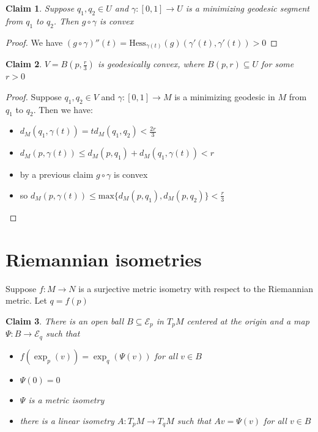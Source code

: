 \documentclass[a4paper,11pt]{article}
\newtheorem{claim}{Claim}
\begin{document}
\begin{claim}
    Suppose $q_1,q_2 \in U$ and $\gamma:[0,1] \to U$ is a minimizing geodesic segment from $q_1$ to $q_2$. 
    Then $g \circ \gamma$ is convex
\end{claim}

\begin{proof}
  We have $(g \circ \gamma)''(t)=\text{Hess}_{\gamma(t)}(g)(\gamma'(t),\gamma'(t))>0$
\end{proof}

\begin{claim}
  $V=B(p,\frac{r}{3})$ is geodesically convex, where $B(p,r) \subseteq U$ for some $r > 0$
\end{claim}

\begin{proof}
  Suppose $q_1,q_2 \in V$ and $\gamma:[0,1] \to M$ is a minimizing geodesic in $M$ from $q_1$ to $q_2$. Then we have:
  
  \begin{itemize}
    \item $d_M(q_1,\gamma(t))=td_M(q_1,q_2)<\frac{2r}{3}$
    \item $d_M(p,\gamma(t)) \leq d_M(p,q_1) + d_M(q_1,\gamma(t)) < r $
    \item by a previous claim $g \circ \gamma$ is convex
    \item so $d_M(p,\gamma(t)) \leq \text{max}\{d_M(p,q_1),d_M(p,q_2)\}<\frac{r}{3}$
  \end{itemize}

\end{proof}

\section{Riemannian isometries}

Suppose $f:M \to N$ is a surjective metric isometry with respect to the Riemannian metric.
Let $q=f(p)$

\begin{claim}
  There is an open ball $B \subseteq \mathcal{E}_p$ in $T_pM$ centered at the origin and a map $\Psi:B \to \mathcal{E}_q$ such that 
  \begin{itemize}
    \item $f(\exp_p(v))=\exp_q(\Psi(v))$ for all $v \in B$
    \item $\Psi(0)=0$
    \item $\Psi$ is a metric isometry
    \item there is a linear isometry $A:T_pM \to T_qM$ such that $Av=\Psi(v)$ for all $v \in B$
  \end{itemize}
\end{claim}
\end{document}
